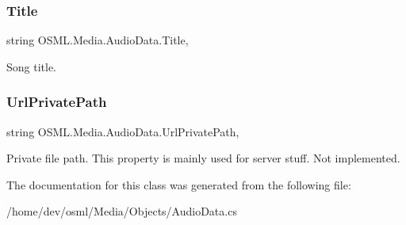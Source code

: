 \subsubsection{\texorpdfstring{Title}{Title}}
{\footnotesize\ttfamily string O\+S\+M\+L.\+Media.\+Audio\+Data.\+Title\hspace{0.3cm}{\ttfamily [get]}, {\ttfamily [set]}}



Song title. 

\mbox{\label{classOSML_1_1Media_1_1AudioData_a48bfa684786ec62d847bdbf41d1c557c}} 
\subsubsection{\texorpdfstring{UrlPrivatePath}{UrlPrivatePath}}
{\footnotesize\ttfamily string O\+S\+M\+L.\+Media.\+Audio\+Data.\+Url\+Private\+Path\hspace{0.3cm}{\ttfamily [get]}, {\ttfamily [set]}}



Private file path. This property is mainly used for server stuff. Not implemented. 



The documentation for this class was generated from the following file\+:\begin{DoxyCompactItemize}
\item 
/home/dev/osml/\+Media/\+Objects/Audio\+Data.\+cs\end{DoxyCompactItemize}

